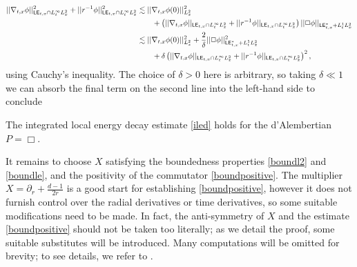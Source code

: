 	\begin{align*}	 
		 ||\nabla_{t, x} \phi||_{\mathsf{LE}_{t, x} \cap L^\infty_t L^2_x}^2 + ||r^{-1} \phi||_{\mathsf{LE}_{t, x} \cap L^\infty_t L^2_x}^2	
		 	&\lesssim  ||\nabla_{t, x} \phi(0)||_{ L^2_x}^2 \\
		 		&\qquad+ \left( ||\nabla_{t, x} \phi||_{\mathsf{LE}_{t, x} \cap L^\infty_tL^2_x} + ||r^{-1} \phi||_{\mathsf{LE}_{t, x} \cap L^\infty_t L^2_x}  \right) ||\Box \phi||_{\mathsf{LE}^*_{t, x} + L^1_t L^2_x}\\
		 	&\lesssim ||\nabla_{t, x}\phi (0)||_{L^2_x}^2 + \frac{2}{\delta} ||\Box \phi||_{\mathsf{LE}^*_{t, x} + L^1_t L^2_x}^2 \\
		 		&\qquad +  \delta \left( ||\nabla_{t, x} \phi||_{\mathsf{LE}_{t, x} \cap L^\infty_t L^2_x} + ||r^{-1} \phi||_{\mathsf{LE}_{t, x} \cap L^\infty_tL^2_x}  \right)^2 ,
	\end{align*}
using Cauchy's inequality. The choice of $\delta > 0$ here is arbitrary, so taking $\delta \ll 1$ we can absorb the final term on the second line into the left-hand side to conclude

\begin{theorem}
	The integrated local energy decay estimate \eqref{iled} holds for the d'Alembertian $P = \Box$. 
\end{theorem}

It remains to choose $X$ satisfying the boundedness properties \eqref{boundl2} and \eqref{boundle}, and the positivity of the commutator \eqref{boundpositive}. The multiplier $X = \partial_r + \tfrac{d - 1}{2r}$ is a good start for establishing \eqref{boundpositive}, however it does not furnish control over the radial derivatives or time derivatives, so some suitable modifications need to be made. In fact, the anti-symmetry of $X$ and the estimate \eqref{boundpositive} should not be taken too literally; as we detail the proof, some suitable substitutes will be introduced. Many computations will be omitted for brevity; to see details, we refer to \cite{MetcalfeSogge2006}.


